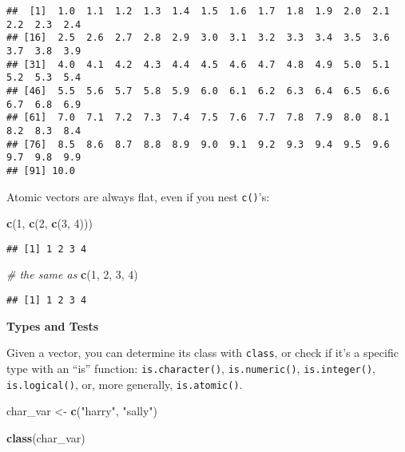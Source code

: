 \documentclass[
]{book}
\newenvironment{Shaded}{\begin{snugshade}}{\end{snugshade}}
\newcommand{\CommentTok}[1]{\textcolor[rgb]{0.56,0.35,0.01}{\textit{#1}}}
\newcommand{\DecValTok}[1]{\textcolor[rgb]{0.00,0.00,0.81}{#1}}
\newcommand{\KeywordTok}[1]{\textcolor[rgb]{0.13,0.29,0.53}{\textbf{#1}}}
\newcommand{\NormalTok}[1]{#1}
\newcommand{\StringTok}[1]{\textcolor[rgb]{0.31,0.60,0.02}{#1}}
\begin{document}
\begin{verbatim}
##  [1]  1.0  1.1  1.2  1.3  1.4  1.5  1.6  1.7  1.8  1.9  2.0  2.1  2.2  2.3  2.4
## [16]  2.5  2.6  2.7  2.8  2.9  3.0  3.1  3.2  3.3  3.4  3.5  3.6  3.7  3.8  3.9
## [31]  4.0  4.1  4.2  4.3  4.4  4.5  4.6  4.7  4.8  4.9  5.0  5.1  5.2  5.3  5.4
## [46]  5.5  5.6  5.7  5.8  5.9  6.0  6.1  6.2  6.3  6.4  6.5  6.6  6.7  6.8  6.9
## [61]  7.0  7.1  7.2  7.3  7.4  7.5  7.6  7.7  7.8  7.9  8.0  8.1  8.2  8.3  8.4
## [76]  8.5  8.6  8.7  8.8  8.9  9.0  9.1  9.2  9.3  9.4  9.5  9.6  9.7  9.8  9.9
## [91] 10.0
\end{verbatim}

Atomic vectors are always flat, even if you nest \texttt{c()}'s:

\begin{Shaded}
\begin{Highlighting}[]
\KeywordTok{c}\NormalTok{(}\DecValTok{1}\NormalTok{, }\KeywordTok{c}\NormalTok{(}\DecValTok{2}\NormalTok{, }\KeywordTok{c}\NormalTok{(}\DecValTok{3}\NormalTok{, }\DecValTok{4}\NormalTok{)))}
\end{Highlighting}
\end{Shaded}

\begin{verbatim}
## [1] 1 2 3 4
\end{verbatim}

\begin{Shaded}
\begin{Highlighting}[]
\CommentTok{\# the same as}
\KeywordTok{c}\NormalTok{(}\DecValTok{1}\NormalTok{, }\DecValTok{2}\NormalTok{, }\DecValTok{3}\NormalTok{, }\DecValTok{4}\NormalTok{)}
\end{Highlighting}
\end{Shaded}

\begin{verbatim}
## [1] 1 2 3 4
\end{verbatim}

\textbf{Types and Tests}

Given a vector, you can determine its class with \texttt{class}, or check if it's a specific type with an ``is'' function: \texttt{is.character()}, \texttt{is.numeric()}, \texttt{is.integer()}, \texttt{is.logical()}, or, more generally, \texttt{is.atomic()}.

\begin{Shaded}
\begin{Highlighting}[]
\NormalTok{char\_var \textless{}{-}}\StringTok{ }\KeywordTok{c}\NormalTok{(}\StringTok{"harry"}\NormalTok{, }\StringTok{"sally"}\NormalTok{)}

\KeywordTok{class}\NormalTok{(char\_var)}
\end{Highlighting}
\end{Shaded}
\end{document}
